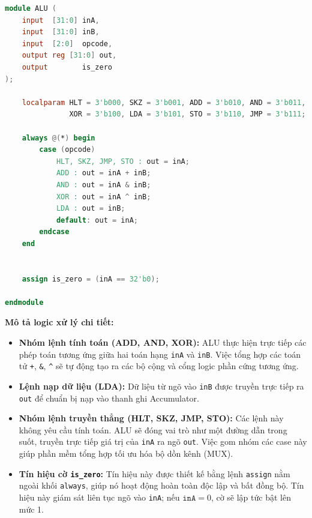

\begin{lstlisting}[language=Verilog, caption={ALU}, label={lst:alu_code}]
module ALU (
    input  [31:0] inA,      
    input  [31:0] inB,      
    input  [2:0]  opcode,   
    output reg [31:0] out,  
    output        is_zero   
);

    localparam HLT = 3'b000, SKZ = 3'b001, ADD = 3'b010, AND = 3'b011,
               XOR = 3'b100, LDA = 3'b101, STO = 3'b110, JMP = 3'b111;

    always @(*) begin
        case (opcode)
            HLT, SKZ, JMP, STO : out = inA; 
            ADD : out = inA + inB;
            AND : out = inA & inB;
            XOR : out = inA ^ inB;
            LDA : out = inB;
            default: out = inA;
        endcase
    end

  
    assign is_zero = (inA == 32'b0); 

endmodule
\end{lstlisting}

\textbf{Mô tả logic xử lý chi tiết:}
\begin{itemize}
    \item \textbf{Nhóm lệnh tính toán (ADD, AND, XOR):} ALU thực hiện trực tiếp các phép toán tương ứng giữa hai toán hạng 
    \texttt{inA} và \texttt{inB}. Việc tổng hợp các toán tử \texttt{+}, \texttt{\&}, \texttt{\textasciicircum} sẽ tự động tạo ra các bộ cộng và cổng logic phần cứng tương ứng.
    \item \textbf{Lệnh nạp dữ liệu (LDA):} Dữ liệu từ ngõ vào \texttt{inB} được truyền trực tiếp ra \texttt{out} để chuẩn bị nạp vào thanh ghi Accumulator.
    \item \textbf{Nhóm lệnh truyền thẳng (HLT, SKZ, JMP, STO):} Các lệnh này không yêu cầu tính toán. 
    ALU sẽ đóng vai trò như một đường dẫn trong suốt, 
    truyền trực tiếp giá trị của \texttt{inA} ra ngõ \texttt{out}. 
    Việc gom nhóm các case này giúp phần mềm tổng hợp tối ưu hóa bộ dồn kênh (MUX).
    \item \textbf{Tín hiệu cờ \texttt{is\_zero}:} Tín hiệu này được thiết kế bằng lệnh \texttt{assign} nằm ngoài khối \texttt{always},
     giúp nó hoạt động hoàn toàn độc lập và bất đồng bộ. 
     Tín hiệu này giám sát liên tục ngõ vào \texttt{inA}; nếu $\texttt{inA} = 0$, cờ sẽ lập tức bật lên mức 1.
\end{itemize}